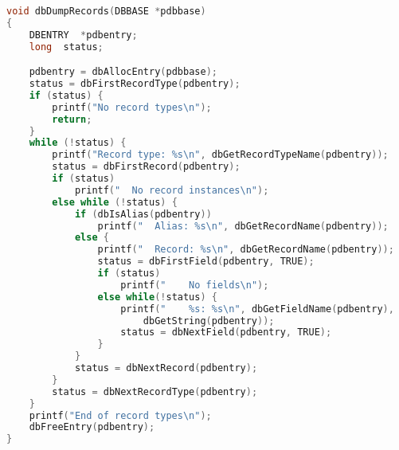 \begin{lstlisting}[language=C]
void dbDumpRecords(DBBASE *pdbbase)
{
    DBENTRY  *pdbentry;
    long  status;

    pdbentry = dbAllocEntry(pdbbase);
    status = dbFirstRecordType(pdbentry);
    if (status) {
        printf("No record types\n");
        return;
    }
    while (!status) {
        printf("Record type: %s\n", dbGetRecordTypeName(pdbentry));
        status = dbFirstRecord(pdbentry);
        if (status)
            printf("  No record instances\n");
        else while (!status) {
            if (dbIsAlias(pdbentry))
                printf("  Alias: %s\n", dbGetRecordName(pdbentry));
            else {
                printf("  Record: %s\n", dbGetRecordName(pdbentry));
                status = dbFirstField(pdbentry, TRUE);
                if (status)
                    printf("    No fields\n");
                else while(!status) {
                    printf("    %s: %s\n", dbGetFieldName(pdbentry),
                        dbGetString(pdbentry));
                    status = dbNextField(pdbentry, TRUE);
                }
            }
            status = dbNextRecord(pdbentry);
        }
        status = dbNextRecordType(pdbentry);
    }
    printf("End of record types\n");
    dbFreeEntry(pdbentry);
}
\end{lstlisting}
